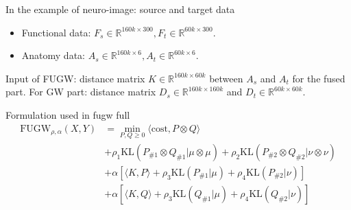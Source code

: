 \documentclass{article}
\theoremstyle{remark}
\begin{document}
In the example of neuro-image: source and target data
\begin{itemize}
    \item Functional data: $F_s \in \mathbb R^{160k \times 300}, F_t \in \mathbb R^{60k \times 300}$.
    \item Anatomy data: $A_s \in \mathbb R^{160k \times 6}, A_t \in \mathbb R^{60k \times 6}$.
\end{itemize}
Input of FUGW: distance matrix $K \in \mathbb R^{160k \times 60k}$ between $A_s$ and $A_t$ for the fused part. For GW part: distance matrix $D_s \in \mathbb R^{160k \times 160k}$ and $D_t \in \mathbb R^{60k \times 60k}$.

Formulation used in fugw full
\begin{equation}
    \begin{split}
        \text{FUGW}_{\rho, \alpha}(X, Y) 
        &= \min_{P, Q \geq 0} \langle \text{cost}, P \otimes Q \rangle \\
        &+ \rho_1 \text{KL}(P_{\# 1} \otimes Q_{\# 1} | \mu \otimes \mu) +
        \rho_2 \text{KL}(P_{\# 2} \otimes Q_{\# 2} | \nu \otimes \nu) \\
        &+ \alpha \left[ \langle K, P \rangle + \rho_3 \text{KL}(P_{\# 1} | \mu) + 
        \rho_4 \text{KL}(P_{\# 2} | \nu) \right] \\
        &+ \alpha \left[ \langle K, Q \rangle + \rho_3 \text{KL}(Q_{\# 1} | \mu) + 
        \rho_4 \text{KL}(Q_{\# 2} | \nu) \right]
    \end{split}
\end{equation}






\end{document}
